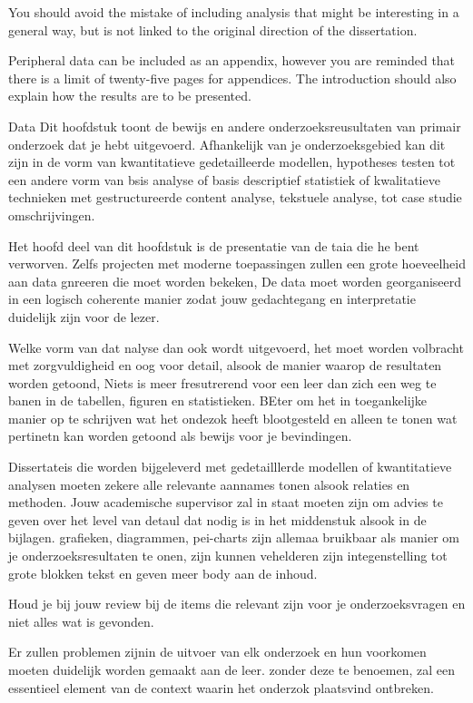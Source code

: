 			You should avoid the mistake of including analysis that might be interesting in a general way, but is not linked to the original direction of the dissertation. 
			
			Peripheral data can be included as an appendix, however you are reminded that there is a limit of twenty-five pages for appendices. The introduction should also explain how the results are to be presented.
			
			
			
			
			Data
			Dit hoofdstuk toont de bewijs en andere onderzoeksreusultaten van primair onderzoek dat je hebt uitgevoerd. Afhankelijk van je onderzoeksgebied kan dit zijn in de vorm van kwantitatieve gedetailleerde modellen,  hypotheses testen tot een andere vorm van bsis analyse of basis descriptief statistiek of kwalitatieve technieken  met gestructureerde content analyse, tekstuele analyse, tot case studie omschrijvingen.
			
			Het hoofd deel van dit hoofdstuk is de presentatie van de taia die he bent verworven. Zelfs projecten met moderne toepassingen zullen een grote hoeveelheid aan data gnreeren die moet worden bekeken, De data moet worden georganiseerd in een logisch coherente manier zodat jouw gedachtegang en interpretatie duidelijk zijn voor de lezer.
			
			Welke vorm van dat nalyse dan ook wordt uitgevoerd, het moet worden volbracht met zorgvuldigheid en oog voor detail, alsook de manier waarop de resultaten worden getoond, Niets is meer fresutrerend voor een leer dan zich een weg te banen in de tabellen, figuren en statistieken. BEter om het in  toegankelijke manier op te schrijven wat het ondezok heeft blootgesteld en alleen te tonen wat pertinetn kan worden getoond als bewijs voor je bevindingen.
			
			
			Dissertateis die worden bijgeleverd met gedetailllerde modellen of kwantitatieve analysen moeten zekere alle relevante aannames tonen alsook relaties en methoden. Jouw academische supervisor zal in staat moeten zijn om advies te geven over het level van detaul dat nodig is in het middenstuk alsook in de bijlagen.
			grafieken, diagrammen, pei-charts zijn allemaa bruikbaar als manier om je onderzoeksresultaten te onen, zijn kunnen vehelderen zijn  integenstelling tot grote blokken tekst en geven meer body aan de inhoud.
			
			Houd je bij jouw review bij de items die relevant zijn voor je onderzoeksvragen en niet alles wat is gevonden.
			
			Er zullen problemen zijnin de uitvoer van elk onderzoek en hun voorkomen moeten duidelijk worden gemaakt aan de leer. zonder deze te benoemen, zal een essentieel element van de context waarin het onderzok plaatsvind ontbreken.
			
